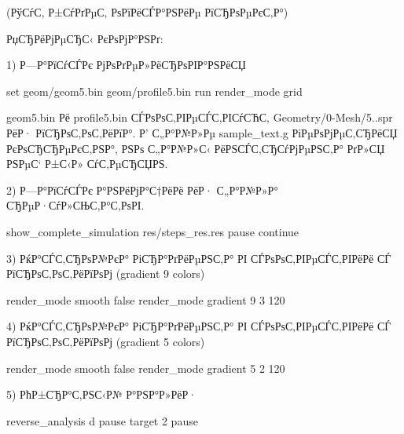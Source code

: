 (РўСѓС‚ Р±СѓРґРµС‚ РѕРїРёСЃР°РЅРёРµ РїСЂРѕРµРєС‚Р°)

РџСЂРёРјРµСЂС‹ РєРѕРјР°РЅРґ\+:

1) Р—Р°РїСѓСЃРє РјРѕРґРµР»РёСЂРѕРІР°РЅРёСЏ

set geom/geom5.\+bin geom/profile5.\+bin run render\+\_\+mode grid

geom5.\+bin Рё profile5.\+bin СЃРѕРѕС‚РІРµСЃС‚РІСѓСЋС‚ Geometry/0-\/\+Mesh/5..\+spr РёР· РїСЂРѕС‚РѕС‚РёРїР°. Р’ С„Р°Р№Р»Рµ sample\+\_\+text.\+g РіРµРѕРјРµС‚СЂРёСЏ РєРѕСЂСЂРµРєС‚РЅР°, РЅРѕ С„Р°Р№Р»С‹ РёРЅСЃС‚СЂСѓРјРµРЅС‚Р° РґР»СЏ РЅРµС‘ Р±С‹Р» СѓС‚РµСЂСЏРЅ.

2) Р—Р°РїСѓСЃРє Р°РЅРёРјР°С†РёРё РёР· С„Р°Р№Р»Р° СЂРµР·СѓР»СЊС‚Р°С‚РѕРІ.

show\+\_\+complete\+\_\+simulation res/steps\+\_\+res.\+res pause continue

3) РќР°СЃС‚СЂРѕР№РєР° РіСЂР°РґРёРµРЅС‚Р° РІ СЃРѕРѕС‚РІРµСЃС‚РІРёРё СЃ РїСЂРѕС‚РѕС‚РёРїРѕРј (gradient 9 colors)

render\+\_\+mode smooth false render\+\_\+mode gradient 9 3 120

4) РќР°СЃС‚СЂРѕР№РєР° РіСЂР°РґРёРµРЅС‚Р° РІ СЃРѕРѕС‚РІРµСЃС‚РІРёРё СЃ РїСЂРѕС‚РѕС‚РёРїРѕРј (gradient 5 colors)

render\+\_\+mode smooth false render\+\_\+mode gradient 5 2 120

5) РћР±СЂР°С‚РЅС‹Р№ Р°РЅР°Р»РёР·

reverse\+\_\+analysis d pause target 2 pause 